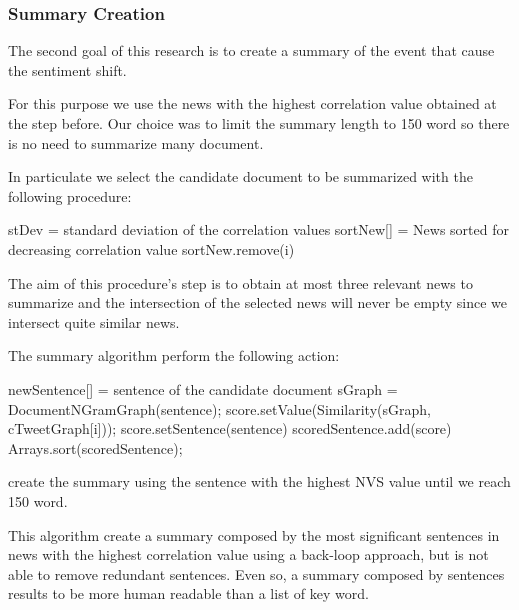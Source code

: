 \subsubsection*{Summary Creation}
The second goal of this research is to create a summary of the event that cause the sentiment shift. 

For this purpose we use the news with the highest correlation value obtained at the step before.
Our choice was to limit the summary length to 150 word so there is no need to summarize many document. 

In particulate we select the candidate document to be summarized with the following procedure:
\begin{algorithmic}
\STATE stDev = standard deviation of the correlation values
\STATE sortNew[] = News sorted for decreasing correlation value
		\STATE sortNew.remove(i)
	\ENDIF
\ENDFOR
\end{algorithmic}

The aim of this procedure's step is to obtain at most three relevant news to summarize and the intersection of the selected news will never be empty since we intersect quite similar news.

The summary algorithm perform the following action:

\begin{algorithmic}
\STATE newSentence[] = sentence of the candidate document
	\STATE sGraph = DocumentNGramGraph(sentence);
    \STATE score.setValue(Similarity(sGraph, cTweetGraph[i]));
    \STATE score.setSentence(sentence)
    \STATE scoredSentence.add(score)
\ENDFOR
\STATE Arrays.sort(scoredSentence);
\end{algorithmic}

create the summary using the sentence with the highest NVS value until we reach 150 word.

This algorithm create a summary composed by the most significant sentences in news with the highest correlation value using a back-loop approach, but is not able to remove redundant sentences. Even so, a summary composed by sentences results to be more human readable than a list of key word.



